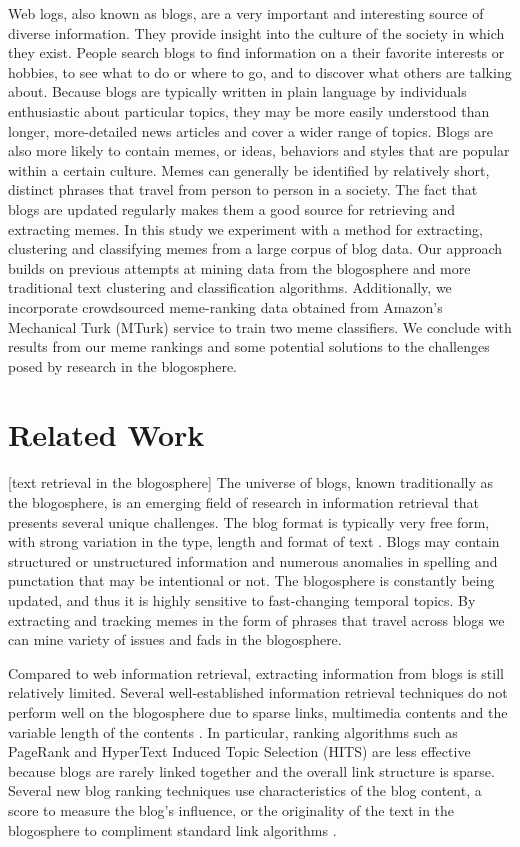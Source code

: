 \documentclass{sig-alternate}
\begin{document}
Web logs, also known as blogs, are a very important and interesting source of diverse information. They provide insight into the culture of the society in which they exist. People search blogs to find information on a their favorite interests or hobbies, to see what to do or where to go, and to discover what others are talking about. Because blogs are typically written in plain language by individuals enthusiastic about particular topics, they may be more easily understood than longer, more-detailed news articles and cover a wider range of topics. Blogs are also more likely to contain memes, or ideas, behaviors and styles that are popular within a certain culture. Memes can generally be identified by relatively short, distinct phrases that travel from person to person in a society.  The fact that blogs are updated regularly makes them a good source for retrieving and extracting memes.  In this study we experiment with a method for extracting, clustering and classifying memes from a large corpus of blog data.  Our approach builds on previous attempts at mining data from the blogosphere and more traditional text clustering and classification algorithms.  Additionally, we incorporate crowdsourced meme-ranking data obtained from Amazon's Mechanical Turk (MTurk) service to train two meme classifiers.  We conclude with results from our meme rankings and some potential solutions to the challenges posed by research in the blogosphere.  

\section{Related Work}
[text retrieval in the blogosphere] 
The universe of blogs, known traditionally as the blogosphere, is an emerging field of research in information retrieval that presents several unique challenges.  The blog format is typically very free form, with strong variation in the type, length and format of text \cite{Schmidt2007}.  Blogs may contain structured or unstructured information and numerous anomalies in spelling and punctation that may be intentional or not.  The blogosphere is constantly being updated, and thus it is highly sensitive to fast-changing temporal topics.  By extracting and tracking memes in the form of phrases that travel across blogs we can mine variety of issues and fads in the blogosphere.  

Compared to web information retrieval, extracting information from blogs is still relatively limited.  Several well-established information retrieval techniques do not perform well on the blogosphere due to sparse links, multimedia contents and the variable length of the contents \cite{Agarwal&Liu2008}.  In particular, ranking algorithms such as PageRank \cite{Brin&Page1998} and HyperText Induced Topic Selection (HITS) \cite{Kleinberg1999} are less effective because blogs are rarely linked together and the overall link structure is sparse.  Several new blog ranking techniques use characteristics of the blog content, a score to measure the blog's influence, or the originality of the text in the blogosphere to compliment standard link algorithms \cite{Song2007}\cite{Hassan,etal2009}. 
\end{document}
